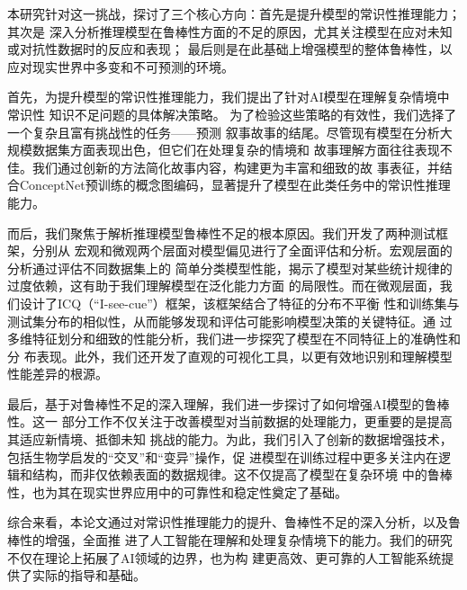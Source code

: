 \documentclass[UTF8,a4paper,12pt]{ctexart}
\numberwithin{equation}{section}
\begin{document}
本研究针对这一挑战，探讨了三个核心方向：首先是提升模型的常识性推理能力；其次是
深入分析推理模型在鲁棒性方面的不足的原因，尤其关注模型在应对未知或对抗性数据时的反应和表现；
最后则是在此基础上增强模型的整体鲁棒性，以应对现实世界中多变和不可预测的环境。

首先，为提升模型的常识性推理能力，我们提出了针对AI模型在理解复杂情境中常识性
知识不足问题的具体解决策略。
为了检验这些策略的有效性，我们选择了一个复杂且富有挑战性的任务——预测
叙事故事的结尾。尽管现有模型在分析大规模数据集方面表现出色，但它们在处理复杂的情境和
故事理解方面往往表现不佳。我们通过创新的方法简化故事内容，构建更为丰富和细致的故
事表征，并结合ConceptNet预训练的概念图编码，显著提升了模型在此类任务中的常识性推理能力。

而后，我们聚焦于解析推理模型鲁棒性不足的根本原因。我们开发了两种测试框架，分别从
宏观和微观两个层面对模型偏见进行了全面评估和分析。宏观层面的分析通过评估不同数据集上的
简单分类模型性能，揭示了模型对某些统计规律的过度依赖，这有助于我们理解模型在泛化能力方面
的局限性。而在微观层面，我们设计了ICQ（``I-see-cue''）框架，该框架结合了特征的分布不平衡
性和训练集与测试集分布的相似性，从而能够发现和评估可能影响模型决策的关键特征。通
过多维特征划分和细致的性能分析，我们进一步探究了模型在不同特征上的准确性和分
布表现。此外，我们还开发了直观的可视化工具，以更有效地识别和理解模型性能差异的根源。

最后，基于对鲁棒性不足的深入理解，我们进一步探讨了如何增强AI模型的鲁棒性。这一
部分工作不仅关注于改善模型对当前数据的处理能力，更重要的是提高其适应新情境、抵御未知
挑战的能力。为此，我们引入了创新的数据增强技术，包括生物学启发的``交叉''和``变异''操作，促
进模型在训练过程中更多关注内在逻辑和结构，而非仅依赖表面的数据规律。这不仅提高了模型在复杂环境
中的鲁棒性，也为其在现实世界应用中的可靠性和稳定性奠定了基础。

综合来看，本论文通过对常识性推理能力的提升、鲁棒性不足的深入分析，以及鲁棒性的增强，全面推
进了人工智能在理解和处理复杂情境下的能力。我们的研究不仅在理论上拓展了AI领域的边界，也为构
建更高效、更可靠的人工智能系统提供了实际的指导和基础。

\end{document}
